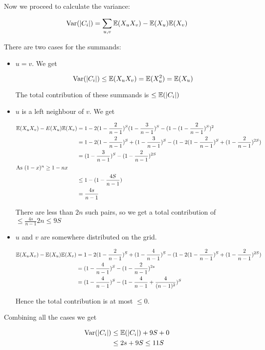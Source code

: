 Now we proceed to calculate the variance:

\begin{align*}
\operatorname{Var}(|C_i|) &= \sum_{u,v} \mathbb{E}(X_uX_v) - \mathbb{E}(X_u) \mathbb{E}(X_v)\\
\end{align*}

There are two cases for the summands:

\begin{itemize}
\item $u=v$. We get

\[\operatorname{Var}(|C_i|) \leq \mathbb{E}(X_uX_v) = \mathbb{E}(X_u^2) = \mathbb{E}(X_u)\]

The total contribution of these summands is $\leq \mathbb{E}(|C_i|)$

\item $u$ is a left neighbour of $v$. We get

\begin{align*}
\mathbb{E}(X_uX_v) -E(X_u) \mathbb{E}(X_v) &= 1-2(1-\frac{2}{n-1})^S  (1-\frac{3}{n-1})^S -(1-(1-\frac{2}{n-1})^S)^2\\
	&=1-2(1-\frac{2}{n-1})^S+(1-\frac{3}{n-1})^S -(1-2(1-\frac{2}{n-1})^S+(1-\frac{2}{n-1})^{2S})\\
	&=(1-\frac{3}{n-1})^S -(1-\frac{2}{n-1})^{2S}\\
\intertext{As $(1-x)^n\geq 1-nx$}
	&\leq 1 -(1-\frac{4S}{n-1})\\
	&=\frac{4s}{n-1}
\end{align*}
	
There are less than $2n$ such pairs, so we get a total contribution of $\leq \frac{4s}{n-1}2n \leq 9S$

\item $u$ and $v$ are somewhere distributed on the grid. 

\begin{align*}
\mathbb{E}(X_uX_v)-\mathbb{E}(X_u)\mathbb{E}(X_v) &= 1-2(1-\frac{2}{n-1})^S+(1-\frac{4}{n-1})^S-(1-2(1-\frac{2}{n-1})^S +(1-\frac{2}{n-1})^{2S})\\
&= (1-\frac{4}{n-1})^S - (1-\frac{2}{n-1})^{2s}\\
&= (1-\frac{4}{n-1})^S-(1-\frac{4}{n-1}+\frac{4}{(n-1)^2})^S\\
\end{align*}

Hence the total contribution is at most $\leq 0$.
\end{itemize}

Combining all the cases we get 

\begin{align*}
\operatorname{Var}(|C_i|) &\leq \mathbb{E}(|C_i|) +9S + 0 \\
	&\leq 2s+9S\leq 11S
\end{align*}


